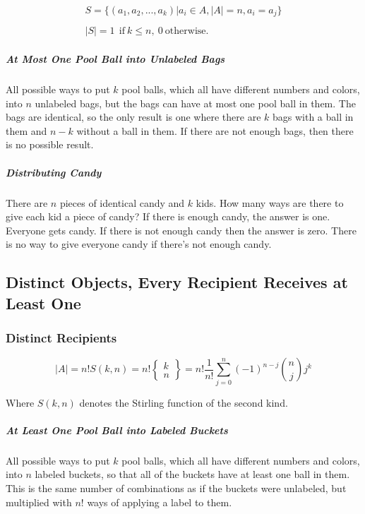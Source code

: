 \begin{equation}
\begin{array}{l}
S = \{ (a_1,a_2,...,a_k) | a_i \in A, |A| = n, a_i=a_j\}\\
\\
|S| = 1\ \ \mathrm{if\ }k\leq n,\ 0\ \mathrm{otherwise.}
\end{array}
\end{equation}



\subparagraph{At Most One Pool Ball into Unlabeled Bags} All possible ways to put $k$ pool balls, which all have different numbers and colors, into $n$ unlabeled bags, but the bags can have at most one pool ball in them. The bags are identical, so the only result is one where there are $k$ bags with a ball in them and $n-k$ without a ball in them. If there are not enough bags, then there is no possible result. 

\subparagraph{Distributing Candy} There are $n$ pieces of identical candy and $k$ kids. How many ways are there to give each kid a piece of candy? If there is enough candy, the answer is one. Everyone gets candy. If there is not enough candy then the answer is zero. There is no way to give everyone candy if there's not enough candy.


\subsection{Distinct Objects, Every Recipient Receives at Least One}

\subsubsection{Distinct Recipients}

\begin{equation}
|A| = n!S(k,n) =n! \left\{ \begin{array}{c} k \\n \end{array}\right\} = n! \frac{1}{n!}\sum_{j=0}^n (-1)^{n-j} {n \choose j }j^k\end{equation}

Where $S(k,n)$	 denotes the Stirling function of the second kind.


\subparagraph{At Least One Pool Ball into Labeled Buckets} All possible ways to put $k$ pool balls, which all have different numbers and colors, into $n$ labeled buckets, so that all of the buckets have at least one ball in them. This is the same number of combinations as if the buckets were unlabeled, but multiplied with $n!$ ways of applying a label to them.

